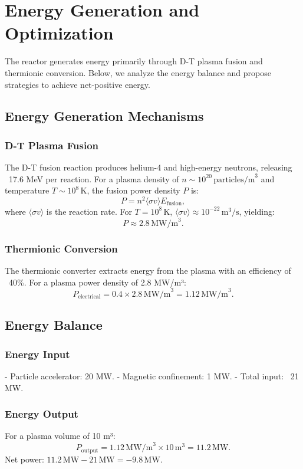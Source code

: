 \documentclass[12pt, a4paper]{article}
\begin{document}
\section{Energy Generation and Optimization}
The reactor generates energy primarily through D-T plasma fusion and thermionic conversion. Below, we analyze the energy balance and propose strategies to achieve net-positive energy.

\subsection{Energy Generation Mechanisms}
\subsubsection{D-T Plasma Fusion}
The D-T fusion reaction produces helium-4 and high-energy neutrons, releasing ~17.6 MeV per reaction. For a plasma density of \( n \sim 10^{20} \, \text{particles/m}^3 \) and temperature \( T \sim 10^8 \, \text{K} \), the fusion power density \( P \) is:
\[
P = n^2 \langle \sigma v \rangle E_{\text{fusion}},
\]
where \( \langle \sigma v \rangle \) is the reaction rate. For \( T = 10^8 \, \text{K} \), \( \langle \sigma v \rangle \approx 10^{-22} \, \text{m}^3/\text{s} \), yielding:
\[
P \approx 2.8 \, \text{MW/m}^3.
\]

\subsubsection{Thermionic Conversion}
The thermionic converter extracts energy from the plasma with an efficiency of ~40\%. For a plasma power density of 2.8 MW/m³:
\[
P_{\text{electrical}} = 0.4 \times 2.8 \, \text{MW/m}^3 = 1.12 \, \text{MW/m}^3.
\]

\subsection{Energy Balance}
\subsubsection{Energy Input}
- Particle accelerator: 20 MW.
- Magnetic confinement: 1 MW.
- Total input: ~21 MW.

\subsubsection{Energy Output}
For a plasma volume of 10 m³:
\[
P_{\text{output}} = 1.12 \, \text{MW/m}^3 \times 10 \, \text{m}^3 = 11.2 \, \text{MW}.
\]
Net power: \( 11.2 \, \text{MW} - 21 \, \text{MW} = -9.8 \, \text{MW} \).
\end{document}
